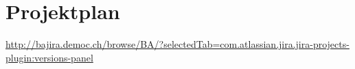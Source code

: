 \chapter*{Projektplan}
	
	\hyperlink{http://bajira.democ.ch/browse/BA/?selectedTab=com.atlassian.jira.jira-projects-plugin:versions-panel}{http://bajira.democ.ch/browse/BA/?selectedTab=com.atlassian.jira.jira-projects-plugin:versions-panel}
